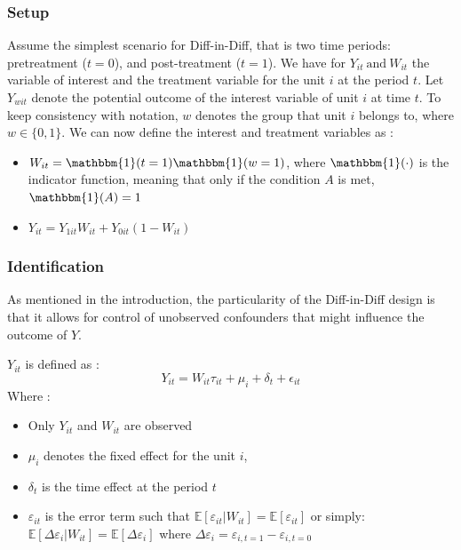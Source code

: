 \documentclass[12pt]{article}
\theoremstyle{plain}
\theoremstyle{remark}
\begin{document}
\subsubsection{Setup}
Assume the simplest scenario for Diff-in-Diff, that is two time periods: pretreatment ($t=0$), and post-treatment ($t=1$). We have for $Y_{it}\ \text{and}\ W_{it} $ the variable of interest and the treatment variable for the unit $i$ at the period $t$. Let $Y_{wit}$ denote the potential outcome of the interest variable of unit $i$ at time $t$. To keep consistency with notation, $w$ denotes the group that unit $i$ belongs to, where $w\in \{0,1\}$. 
We can now define the interest and treatment variables as :

\begin{itemize}     
    \item  $W_{it}= \mathbbm{1}(t=1)\mathbbm{1}(w=1)$, where $\mathbbm{1}(\cdot)$ is the indicator function, meaning that only if the condition $A$ is met, $\mathbbm{1}(A)=1$
            
    \item $Y_{it} = Y_{1it}W_{it} + Y_{0it}\left(1-W_{it}\right)$
\end{itemize}

\subsubsection{Identification}
As mentioned in the introduction, the particularity of the Diff-in-Diff design is that it allows for control of unobserved confounders that might influence the outcome of $Y$.

$Y_{it}$ is defined as : 
    \begin{equation}
        Y_{it}=W_{it}\tau_{it}+\mu_{i}+\delta_t+\epsilon_{it} 
    \end{equation}
    Where :
\begin{itemize}
        \item  Only $Y_{it}$ and $W_{it}$ are observed
        \item $\mu_{i}$ denotes the fixed effect for the unit $i$,
        \item $\delta_t$ is the time effect at the period $t$
        \item         $\varepsilon_{it}$ is the error term such that $\mathbb{E}\left[\varepsilon_{it}|W_{it} \right] 
        = \mathbb{E}\left[\varepsilon_{it}\right] $ or simply:
        $\mathbb{E}\left[\Delta \varepsilon_{i}|W_{it} \right] 
        = \mathbb{E}\left[\Delta\varepsilon_{i}\right] $ where 
        $\Delta\varepsilon_{i} = \varepsilon_{i, t=1}-\varepsilon_{i, t=0}$
\end{itemize}
        
\end{document}
